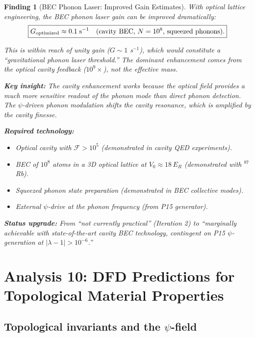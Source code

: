\documentclass[11pt]{article}
\newtheorem{finding}{Finding}
\begin{document}
\begin{finding}[BEC Phonon Laser: Improved Gain Estimates]
With optical lattice engineering, the BEC phonon laser gain can be improved dramatically:
\begin{equation}\label{eq:bec-gain}
\boxed{G_{\rm optimized} \approx 0.1\;\text{s}^{-1} \quad \text{(cavity BEC, $N = 10^8$, squeezed phonons)}.}
\end{equation}

This is within reach of unity gain ($G \sim 1$ s$^{-1}$), which would constitute a ``gravitational phonon laser threshold.'' The dominant enhancement comes from the optical cavity feedback ($10^9\times$), not the effective mass.

\textbf{Key insight:} The cavity enhancement works because the optical field provides a much more sensitive readout of the phonon mode than direct phonon detection. The $\psi$-driven phonon modulation shifts the cavity resonance, which is amplified by the cavity finesse.

\textbf{Required technology:}
\begin{itemize}
\item Optical cavity with $\mathcal{F} > 10^5$ (demonstrated in cavity QED experiments).
\item BEC of $10^8$ atoms in a 3D optical lattice at $V_0 \approx 18\,E_R$ (demonstrated with $^{87}$Rb).
\item Squeezed phonon state preparation (demonstrated in BEC collective modes).
\item External $\psi$-drive at the phonon frequency (from P15 generator).
\end{itemize}

\textbf{Status upgrade:} From ``not currently practical'' (Iteration 2) to ``marginally achievable with state-of-the-art cavity BEC technology, contingent on P15 $\psi$-generation at $|\lambda-1| > 10^{-6}$.''
\end{finding}

\section{Analysis 10: DFD Predictions for Topological Material Properties}
\label{sec:topological}

\subsection{Topological invariants and the $\psi$-field}
\end{document}
